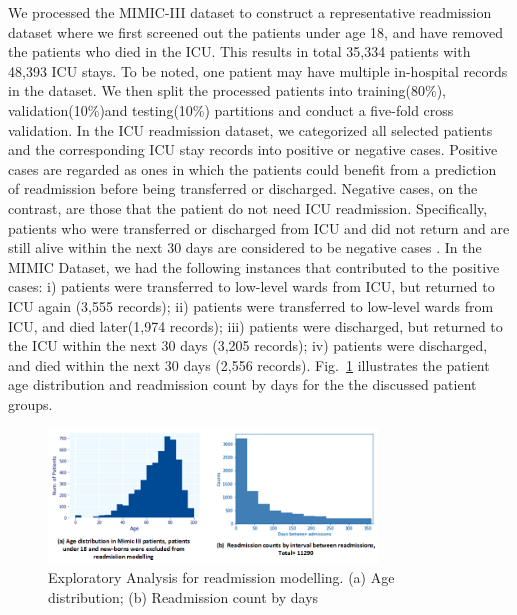 \documentclass[letterpaper, 10pt, conference]{ieeeconf} %
\newcommand{\fig}[1]{Fig.~\ref{#1}}
\begin{document}
We processed the MIMIC-III dataset to construct a representative readmission dataset where we first screened out the patients under age 18, and have removed the patients who died in the ICU. This results in total 35,334 patients with 48,393 ICU stays. To be noted, one patient may have multiple in-hospital records in the dataset. We then split the processed patients into training(80\%),
validation(10\%)and testing(10\%) partitions and conduct a five-fold cross validation. In the ICU readmission dataset, we categorized all selected patients and the corresponding ICU stay records into positive or negative cases. Positive cases are regarded as ones in which the patients could benefit from a prediction of readmission before being transferred or discharged. Negative cases, on the 
contrast, are those that the patient do not need ICU readmission. Specifically, patients who were transferred or discharged from ICU and did not return and are still alive within the next 30 days are considered to be negative cases \cite{Desautelse017199}. In the MIMIC Dataset, we had the following instances that contributed to the positive cases: i) patients were transferred to low-level wards from ICU, but returned to ICU again (3,555 records); ii) patients were transferred to low-level wards from ICU, and died later(1,974 records); iii) patients were discharged, but returned to the ICU within the next 30 days (3,205 records); iv) patients were discharged, and died within the next 30 days (2,556 records). \fig{fig:exp} illustrates the patient age distribution and readmission count by days for the the discussed patient groups.


\begin{figure}
  \centering
  \includegraphics[width=0.78\textwidth]{Figures/mimic3_readmission_exploratory.png}
\caption{Exploratory Analysis for readmission modelling. (a) Age distribution; (b) Readmission count by days }
\label{fig:exp}
\end{figure}

\end{document}

